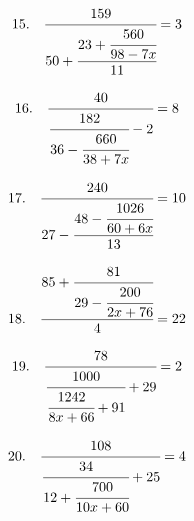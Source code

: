 \documentclass{article}
\begin{document}
\noindent
\begin{minipage}[t]{0.5000\textwidth}
\begin{align*}
15.\hspace{10pt}\cfrac{159}{50+\cfrac{23+\cfrac{560}{98-7x}}{11}}&=3
\end{align*}
\end{minipage}
\begin{minipage}[t]{0.5000\textwidth}
\begin{align*}
16.\hspace{10pt}\cfrac{40}{\cfrac{182}{36-\cfrac{660}{38+7x}}-2}&=8
\end{align*}
\end{minipage}
\vspace{10 mm}

\noindent
\begin{minipage}[t]{0.5000\textwidth}
\begin{align*}
17.\hspace{10pt}\cfrac{240}{27-\cfrac{48-\cfrac{1026}{60+6x}}{13}}&=10
\end{align*}
\end{minipage}
\begin{minipage}[t]{0.5000\textwidth}
\begin{align*}
18.\hspace{10pt}\cfrac{85+\cfrac{81}{29-\cfrac{200}{2x+76}}}{4}&=22
\end{align*}
\end{minipage}
\vspace{10 mm}

\noindent
\begin{minipage}[t]{0.5000\textwidth}
\begin{align*}
19.\hspace{10pt}\cfrac{78}{\cfrac{1000}{\cfrac{1242}{8x+66}+91}+29}&=2
\end{align*}
\end{minipage}
\begin{minipage}[t]{0.5000\textwidth}
\begin{align*}
20.\hspace{10pt}\cfrac{108}{\cfrac{34}{12+\cfrac{700}{10x+60}}+25}&=4
\end{align*}
\end{minipage}
\end{document}
